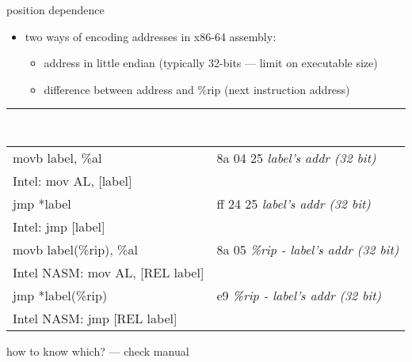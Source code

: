 \begin{frame}[fragile,label=picVNot]{position dependence}
\begin{itemize}
\item two ways of encoding addresses in x86-64 assembly:
    \begin{itemize}
    \item address in little endian (typically 32-bits --- limit on executable size)
    \item difference between address and \%rip (next instruction address)
    \end{itemize}
\end{itemize}
\hrule
{\tt
\begin{tabular}{l|l}
movb label, \%al & 8a 04 25 {\normalfont\it label's addr (32 bit)} \\
{\small {\normalfont Intel:} mov AL, [label]} \\
jmp *label & ff 24 25 {\normalfont\it label's addr (32 bit)} \\
{\small {\normalfont Intel:} jmp [label]} \\
movb label(\%rip), \%al & 8a 05 {\normalfont\it \%rip - label's addr (32 bit)} \\
{\small {\normalfont Intel NASM:} mov AL, [REL label] } \\
jmp *label(\%rip) & e9 {\normalfont\it \%rip - label's addr (32 bit)} \\
{\small {\normalfont Intel NASM:} jmp [REL label]} \\
\end{tabular}
}
how to know which? --- check manual
\end{frame}
